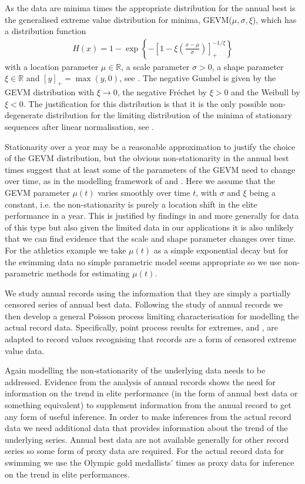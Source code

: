 \documentclass[10pt]{article}
\begin{document}
As the data are minima times the appropriate distribution for
the annual best is the generalised 
extreme value distribution for minima,  GEVM($\mu,\sigma,\xi$), 
which has a distribution function 
\begin{align}
 H(x) = 1 -\exp\left\{-\left[ 1 -
    \xi\left(\frac{x-\mu}{\sigma}\right)  \right]^{-1/\xi}_+\right\}
\label{C5eqn00}
\end{align}
with a location parameter $\mu \in \mathbb{R}$, a scale parameter
$\sigma > 0$, a shape parameter $\xi \in \mathbb{R}$ and
$[y]_+=\max(y,0)$, see \citet{Coles}. The negative
Gumbel is given by the GEVM distribution with $\xi \rightarrow 0$, the
negative Fr\'echet by $\xi >0$ and the Weibull by $\xi<0$. 
The justification for this 
distribution is that it is the only possible non-degenerate
distribution  
for the limiting distribution of the minima of stationary sequences
after linear normalisation, see \citet{Rootzen1983}.%

Stationarity over a year may be a reasonable approximation to 
justify the choice of the GEVM distribution, but the obvious 
non-stationarity in the annual best times 
suggest that at least some of the parameters of the GEVM 
need to change over time, as in the modelling framework of 
\citet{Davison1990} and \citet{Coles}. 
Here we assume that the GEVM parameter $\mu(t)$ varies 
smoothly over time $t$, with $\sigma$ and $\xi$ being
a constant, i.e. the non-stationarity is purely a location shift
in the elite performance in a year. This is justified by
findings in \citet{Adam2007c} and \citet{Adam2007b} more generally for
data of this type but also 
given the limited data in our applications 
it is also unlikely that we can find
evidence that the scale and shape parameter changes over time.
For the athletics example we take $\mu(t)$
 as a simple exponential decay but for the swimming data no simple
 parametric model seems appropriate so we use non-parametric methods
 for estimating $\mu(t)$.

We study annual records using the information that they 
are simply a partially censored series of annual best data. 
Following the study of annual records we 
then develop a general Poisson process limiting
characterisation for modelling the  actual record data. 
Specifically, point process results for extremes, \cite{Pickands1971}
and \cite{Smith1989}, are adapted to record values 
recognising that records are a form of censored extreme value data. 

Again modelling the non-stationarity of the underlying data
needs to be addressed. 
Evidence from the analysis of annual records shows the need
for information on the trend in elite performance (in the form of
annual best data or something equivalent) to supplement
information from the annual record to get any form of useful
inference.  In order to make inferences from the actual record data 
we need additional data that provides information about the 
trend of the underlying series. Annual best data are not available
generally for other record series so some form of proxy data are required.
For the actual record data for swimming 
we use the Olympic gold medallists' times as proxy data for inference
on the trend in elite performances.
\end{document}

